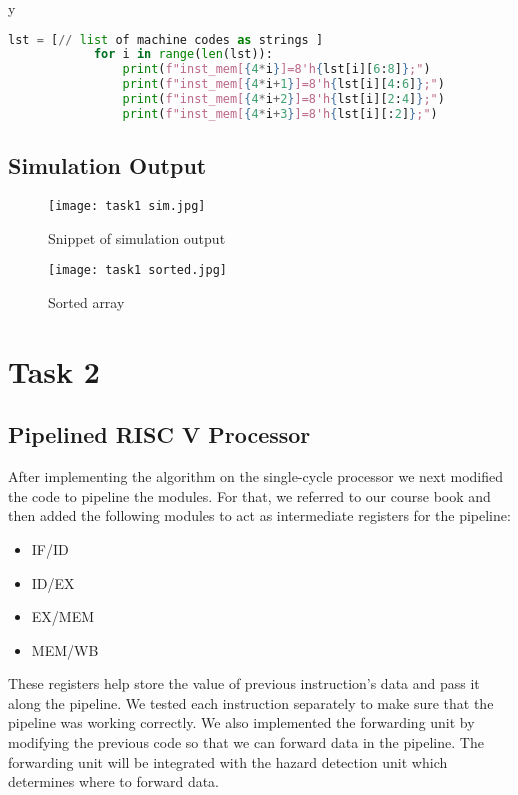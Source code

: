 y\documentclass[12pt]{article}
\begin{document}
        \begin{lstlisting}[language=Python, caption={python script to initialize instruction memory}, label=lst:example]
        lst = [// list of machine codes as strings ]
            for i in range(len(lst)):
                print(f"inst_mem[{4*i}]=8'h{lst[i][6:8]};")
                print(f"inst_mem[{4*i+1}]=8'h{lst[i][4:6]};")
                print(f"inst_mem[{4*i+2}]=8'h{lst[i][2:4]};")
                print(f"inst_mem[{4*i+3}]=8'h{lst[i][:2]};")
        \end{lstlisting}

\subsection{Simulation Output}\label{code1}
    \begin{figure}[htbp!]
        \centering
        \texttt{[image: task1 sim.jpg]}
        \caption{Snippet of simulation output}
    \end{figure}
   
    \begin{figure}[htbp!]
    \begin{center}
            
            \texttt{[image: task1 sorted.jpg]}
            \caption{Sorted array}
    \end{center}
    \end{figure}

\section{Task 2}\label{task2}
    \subsection{Pipelined RISC V Processor}\label{task2intro}
    After implementing the algorithm on the single-cycle processor we next modified the code to pipeline the modules. For that, we referred to our course book and then added the following modules to act as intermediate registers for the pipeline:
    \begin{itemize}
        \item IF/ID
        \item ID/EX
        \item EX/MEM
        \item MEM/WB
    \end{itemize}
    These registers help store the value of previous instruction's data and pass it along the pipeline. We tested each instruction separately to make sure that the pipeline was working correctly. We also implemented the forwarding unit by modifying the previous code so that we can forward data in the pipeline. The forwarding unit will be integrated with the hazard detection unit which determines where to forward data.
\newpage
\end{document}
